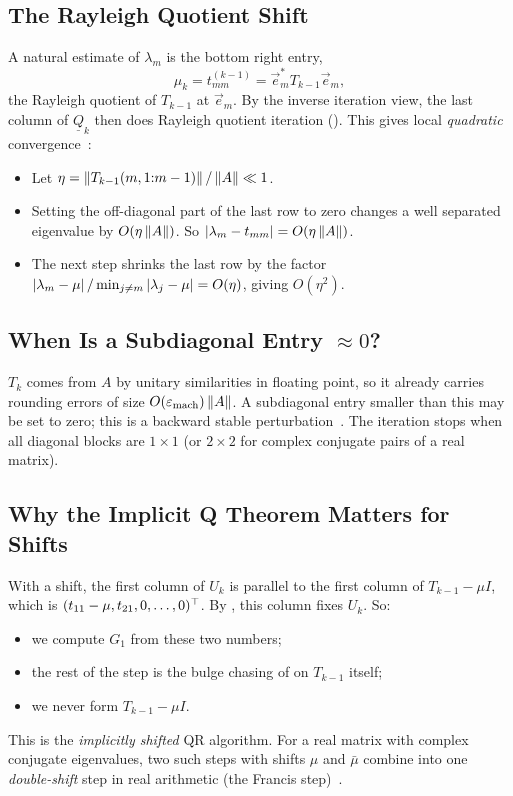 \subsection{The Rayleigh Quotient Shift}
\label{sec:rq-shift-supp}

A natural estimate of $\lambda_m$ is the bottom right entry,
\begin{equation*}
  \mu_k = t_{mm}^{(k-1)} = \vec{e}_m^\ast T_{k-1}\vec{e}_m,
\end{equation*}
the Rayleigh quotient of $T_{k-1}$ at $\vec{e}_m$. By the inverse iteration view, the last column of $\underline{Q}_k$ then does Rayleigh quotient iteration (). This gives local \emph{quadratic} convergence~\cite[Section 4.4.4]{Demmel}:
\begin{itemize}
  \item Let $\eta = \left\lVert T_{k-1}(m, 1{:}m-1) \right\rVert/\left\lVert A \right\rVert \ll 1$.
  \item Setting the off-diagonal part of the last row to zero changes a well separated eigenvalue by $O(\eta\left\lVert A \right\rVert)$. So $\left\lvert \lambda_m - t_{mm} \right\rvert = O(\eta\left\lVert A \right\rVert)$.
  \item The next step shrinks the last row by the factor $\left\lvert \lambda_m - \mu \right\rvert/\min_{j \ne m}\left\lvert \lambda_j - \mu \right\rvert = O(\eta)$, giving $O(\eta^2)$.
\end{itemize}

\subsection{When Is a Subdiagonal Entry $\approx 0$?}

$T_k$ comes from $A$ by unitary similarities in floating point, so it already carries rounding errors of size $O(\varepsilon_{\mathrm{mach}})\left\lVert A \right\rVert$. A subdiagonal entry smaller than this may be set to zero; this is a backward stable perturbation~\cite[Section 4.4.5]{Demmel}. The iteration stops when all diagonal blocks are $1 \times 1$ (or $2 \times 2$ for complex conjugate pairs of a real matrix).

\subsection{Why the Implicit Q Theorem Matters for Shifts}
\label{sec:implicit-q-shifts}

With a shift, the first column of $U_k$ is parallel to the first column of $T_{k-1} - \mu I$, which is $(t_{11} - \mu, t_{21}, 0, \dots, 0)^\top$. By , this column fixes $U_k$. So:
\begin{itemize}
  \item we compute $G_1$ from these two numbers;
  \item the rest of the step is the bulge chasing of  on $T_{k-1}$ itself;
  \item we never form $T_{k-1} - \mu I$.
\end{itemize}
This is the \emph{implicitly shifted} QR algorithm. For a real matrix with complex conjugate eigenvalues, two such steps with shifts $\mu$ and $\bar{\mu}$ combine into one \emph{double-shift} step in real arithmetic (the Francis step)~\cite[Section 4.4.8]{Demmel}.
